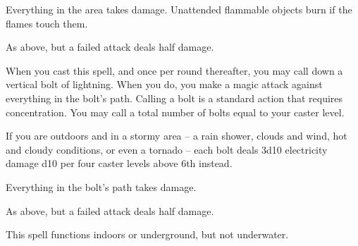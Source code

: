 \begin{spellsuccess}
    Everything in the area takes damage. Unattended flammable objects burn if the flames touch them.
\end{spellsuccess}
\begin{spellfailure}
    As above, but a failed attack deals half damage.
\end{spellfailure}

\begin{comment}
\subsubsection{C}
\end{comment}

\spellrng{\rngmed}
\begin{spelleffect}
    When you cast this spell, and once per round thereafter, you may call down a vertical bolt of lightning. When you do, you make a magic attack against everything in the bolt's path. Calling a bolt is a standard action that requires concentration. You may call a total number of bolts equal to your caster level.

    If you are outdoors and in a stormy area -- a rain shower, clouds and wind, hot and cloudy conditions, or even a tornado -- each bolt deals 3d10 electricity damage \add d10 per four caster levels above 6th instead.
\end{spelleffect}
\begin{spellsuccess}
    Everything in the bolt's path takes damage.
\end{spellsuccess}
\begin{spellfailure}
    As above, but a failed attack deals half damage.
\end{spellfailure}
\begin{spellnotes}
    This spell functions indoors or underground, but not underwater. \destructivespellnotes
\end{spellnotes}


